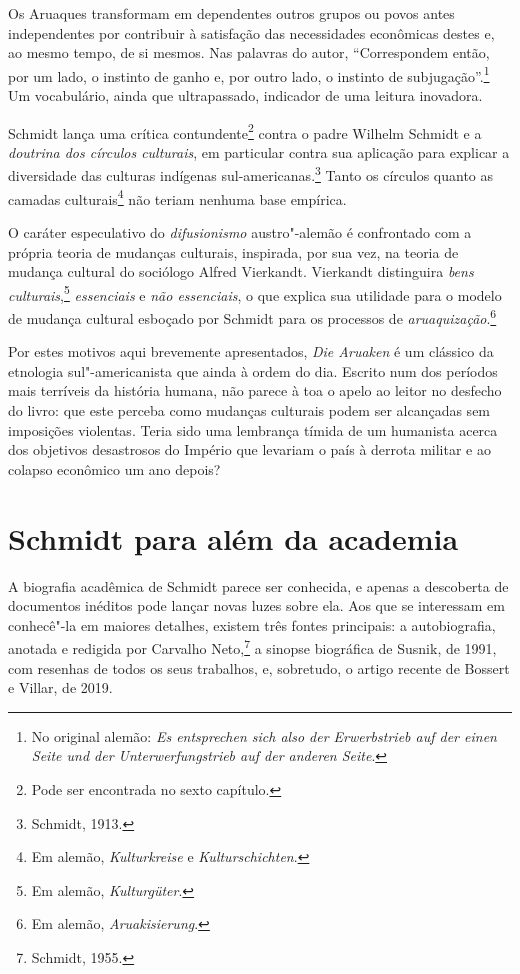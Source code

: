 Os Aruaques transformam em dependentes outros grupos ou povos antes independentes por contribuir à satisfação das necessidades econômicas destes e, ao mesmo tempo, de si mesmos. Nas palavras do autor, ``Correspondem então, por um lado, o instinto de ganho e, por outro lado, o instinto de subjugação''.\footnote{No original alemão: \textit{Es entsprechen sich also der Erwerbstrieb auf der einen Seite und der Unterwerfungstrieb auf der anderen Seite}.} Um vocabulário, ainda que ultrapassado, indicador de uma leitura inovadora.

Schmidt lança uma crítica contundente\footnote{Pode ser encontrada no sexto capítulo.} contra o padre Wilhelm Schmidt e a \textit{doutrina dos círculos culturais}, em particular contra sua aplicação para explicar a diversidade das culturas indígenas sul-americanas.\footnote{Schmidt, 1913.} Tanto os círculos quanto as camadas culturais\footnote{Em alemão, \textit{Kulturkreise} e \textit{Kulturschichten}.} não teriam nenhuma base empírica. 

O caráter especulativo do \textit{difusionismo} austro"-alemão é confrontado com a própria teoria de mudanças culturais, inspirada, por sua vez, na teoria de mudança cultural do sociólogo Alfred Vierkandt. Vierkandt distinguira \textit{bens culturais},\footnote{Em alemão, \textit{Kulturgüter}.} \textit{essenciais} e \textit{não essenciais}, o que explica sua utilidade para o modelo de mudança cultural esboçado por Schmidt para os processos de \textit{aruaquização}.\footnote{Em alemão, \textit{Aruakisierung}.}

Por estes motivos aqui brevemente apresentados, \textit{Die Aruaken} é um clássico da etnologia sul"-americanista que ainda à ordem do dia. Escrito num dos períodos mais terríveis da história humana, não parece à toa o apelo ao leitor no desfecho do livro: que este perceba como mudanças culturais podem ser alcançadas sem imposições violentas. Teria sido uma lembrança tímida de um humanista acerca dos objetivos desastrosos do Império que levariam o país à derrota militar e ao colapso econômico um ano depois?

\section{Schmidt para além da academia}

A biografia acadêmica de Schmidt parece ser conhecida, e apenas a descoberta de documentos inéditos pode lançar novas luzes sobre ela. Aos que se interessam em conhecê"-la em maiores detalhes, existem três fontes principais: a autobiografia, anotada e redigida por Carvalho Neto,\footnote{Schmidt, 1955.} a sinopse biográfica de Susnik, de 1991, com resenhas de todos os seus trabalhos, e, sobretudo, o artigo recente de Bossert e Villar, de 2019. 

